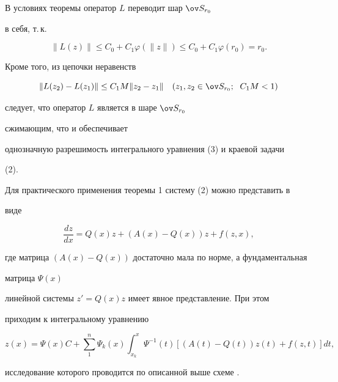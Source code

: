  


\begin{pf} 


В условиях теоремы оператор $L$ переводит шар $\ov S_{r_0}$ 


в себя, т.\,к. 


$$ 


\|L(z)\|\le C_0+C_1\varphi(\|z\|)\le C_0+C_1\varphi(r_0)=r_0. 


$$ 


Кроме того, из цепочки неравенств 


$$ 


\|L(z_2)-L(z_1)\|\le C_1M\|z_2-z_1\|\quad 


(z_1,z_2\in\ov S_{r_0};\ \; C_1M<1) 


$$ 


следует, что оператор $L$ является в шаре $\ov S_{r_0}$ 


сжимающим, что и обеспечивает 


однозначную разрешимость интегрального уравнения (3) и краевой задачи 


(2). 


\end{pf} 


 


\begin{note} 


Для практического применения теоремы 1 систему (2) можно представить в 


виде 


$$ 


\frac{dz}{dx}=Q(x)z+(A(x)-Q(x))z+f(z,x), 


$$ 


где матрица $(A(x)-Q(x))$ достаточно мала по норме, а фундаментальная 


матрица $\Psi(x)$ 


линейной системы $z'=Q(x)z$ имеет явное представление. При этом 


приходим к интегральному уравнению 


$$ 


z(x)=\Psi(x)C+\sum^n_1\Psi_k(x)\int^x_{x_k} 


\Psi^{-1}(t)[(A(t)-Q(t))z(t)+f(z,t)]dt, 


$$ 


исследование которого проводится по описанной выше схеме \cite{5}. 


\end{note} 


